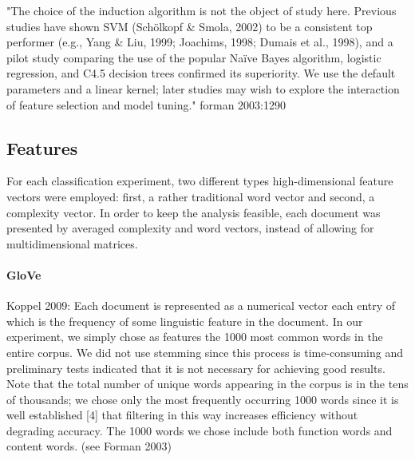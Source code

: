 \documentclass[11pt]{article}
\begin{document}


"The choice of the induction algorithm is not the object of study here. Previous studies have shown SVM (Schölkopf & Smola, 2002) to be a consistent top performer (e.g., Yang & Liu, 1999; Joachims, 1998; Dumais et al., 1998), and a pilot study comparing the use of the popular Naïve Bayes algorithm, logistic regression, and C4.5 decision trees confirmed its superiority. We use the default parameters and a linear kernel; later studies may wish to explore the interaction of feature selection and model tuning." forman 2003:1290

\subsection{Features}

For each classification experiment, two different types high-dimensional feature vectors were employed: first, a rather traditional word vector and second, a complexity vector. In order to keep the analysis feasible, each document was presented by averaged complexity and word vectors, instead of allowing for multidimensional matrices.

\paragraph{GloVe}

Koppel 2009:
Each document is represented as a numerical vector each entry of which is the frequency of some linguistic feature in the document. In our experiment, we simply chose as features the 1000 most common words in the entire corpus. We did not use stemming since this process is time-consuming and preliminary tests indicated that it is not necessary for achieving good results. Note that the total number of unique words appearing in the corpus is in the tens of thousands; we chose only the most frequently occurring 1000 words since it is well established [4] that filtering in this way increases efficiency without degrading accuracy. The 1000 words we chose include both function words and content words. (see Forman 2003)
\end{document}
